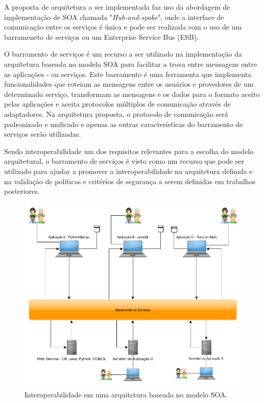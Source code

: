 A proposta de arquitetura a ser implementada faz uso da abordagem de implementação de SOA chamada "\textit{Hub-and-spoke}", onde a interface de comunicação entre os serviços é única e pode ser realizada com o uso de um barrameneto de serviços ou um Enterprise Service Bus (ESB).

O barramento de serviços é um recurso a ser utilizado na implementação da arquitetura baseada no modelo SOA para facilitar a troca entre mensagens entre as aplicações - ou serviços. Este barramento é uma ferramenta que implementa funcionalidades que roteiam as mensagens entre os usuários e provedores de um determinado serviço, transformam as mensagens e os dados para o formato aceito pelas aplicações e aceita protocolos múltiplos de comunicação através de adaptadores. Na arquitetura proposta, o protocolo de comunicação será padronizado e unificado e apenas as outras características do barramento de serviços serão utilizadas.

Sendo interoperabilidade um dos requisitos relevantes para a escolha do modelo arquitetural, o barramento de serviços é visto como um recurso que pode ser utilizado para ajudar a promover a interoperabilidade na arquitetura definida e na validação de políticas e critérios de segurança a serem definidas em trabalhos posteriores.

\begin{figure}[htb]
\centering
\includegraphics[width=1\textwidth]{figuras/barramento_interoperabilidade.png}
\caption{Interoperabilidade em uma arquitetura baseada no modelo SOA.}
\label{barramento_interoperabilidade}
\end{figure}

